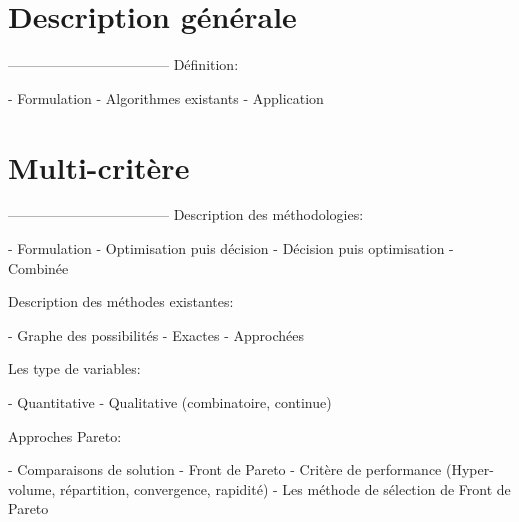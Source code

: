 
\section{Description générale} %
\label{sec:description_generale}
-----------------------------------
Définition:

 - Formulation
 - Algorithmes existants
 - Application







\section{Multi-critère} %
\label{sec:multi_critere}
-----------------------------------
Description des méthodologies:

 - Formulation
 - Optimisation puis décision
 - Décision puis optimisation
 - Combinée


Description des méthodes existantes:

 - Graphe des possibilités
 - Exactes
 - Approchées


Les type de variables:

 - Quantitative
 - Qualitative (combinatoire, continue)


Approches Pareto:

 - Comparaisons de solution
 - Front de Pareto
 - Critère de performance (Hyper-volume, répartition, convergence, rapidité)
 - Les méthode de sélection de Front de Pareto


